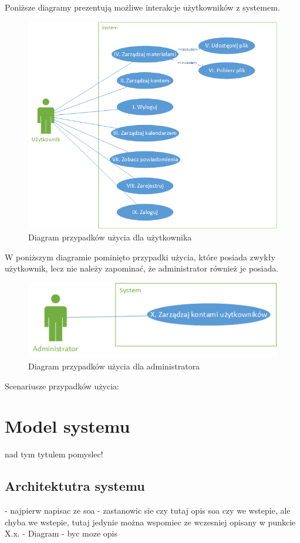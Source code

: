Poniższe diagramy prezentują możliwe interakcje użytkowników z systemem.
\begin{figure}[H]
	\centering
	\includegraphics[scale=0.7]{UseCaseUser}
	\caption{\label{fig:caption_01}Diagram przypadków użycia dla użytkownika}
\end{figure}
W poniższym diagramie pominięto przypadki użycia, które posiada zwykły użytkownik, lecz nie należy zapominać, że administrator również je posiada.
\begin{figure}[H]
	\centering
	\includegraphics[scale=0.7]{UseCaseAdmin.png}
	\caption{\label{fig:caption_02}Diagram przypadków użycia dla administratora}
\end{figure}

Scenariusze przypadków użycia:


\section{Model systemu}
nad tym tytulem pomyslec!\newline
\subsection{Architektutra systemu}
- najpierw napisac ze soa\newline
- zastanowic sie czy tutaj opis soa czy we wstepie, ale chyba we wstepie, tutaj jedynie można wspomiec ze wczesniej opisany w punkcie X.x.\newline
- Diagram \newline
- byc moze opis

